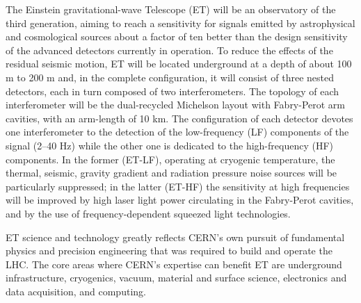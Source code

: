 
The Einstein gravitational-wave Telescope (ET) will be an observatory of the third generation, aiming to reach a sensitivity for signals emitted by astrophysical and cosmological sources about a factor of ten better than the design sensitivity of the advanced detectors currently in operation. To reduce the effects of the residual seismic motion, ET will be located underground at a depth of about 100 m to 200 m and, in the complete configuration, it will consist of three nested detectors, each in turn composed of two interferometers. The topology of each interferometer will be the dual-recycled Michelson layout with Fabry-Perot arm cavities, with an arm-length of 10 km. The configuration of each detector devotes one interferometer to the detection of the low-frequency (LF) components of the signal (2--40 Hz) while the other one is dedicated to the high-frequency (HF) components. In the former (ET-LF), operating at cryogenic temperature, the thermal, seismic, gravity gradient and radiation pressure noise sources will be particularly suppressed; in the latter (ET-HF) the sensitivity at high frequencies will be improved by high laser light power circulating in the Fabry-Perot cavities, and by the use of frequency-dependent squeezed light technologies.

ET science and technology greatly reflects CERN's own pursuit of fundamental physics and precision engineering that was required to build and operate the LHC. The core areas where CERN's expertise can benefit ET are underground infrastructure, cryogenics, vacuum, material and surface science, electronics and data acquisition, and computing.
\vspace*{-4mm}